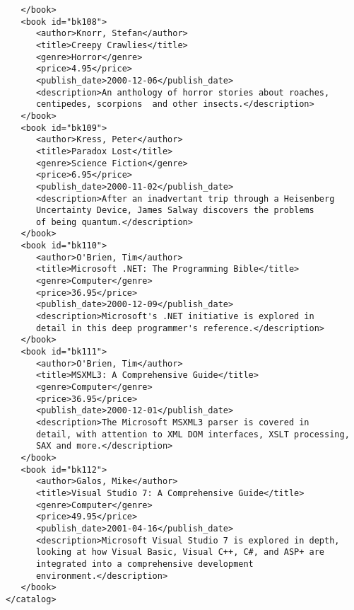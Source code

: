 \documentclass[11pt,english]{article}
\begin{document}
\begin{lstlisting}
   </book>
   <book id="bk108">
      <author>Knorr, Stefan</author>
      <title>Creepy Crawlies</title>
      <genre>Horror</genre>
      <price>4.95</price>
      <publish_date>2000-12-06</publish_date>
      <description>An anthology of horror stories about roaches,
      centipedes, scorpions  and other insects.</description>
   </book>
   <book id="bk109">
      <author>Kress, Peter</author>
      <title>Paradox Lost</title>
      <genre>Science Fiction</genre>
      <price>6.95</price>
      <publish_date>2000-11-02</publish_date>
      <description>After an inadvertant trip through a Heisenberg
      Uncertainty Device, James Salway discovers the problems 
      of being quantum.</description>
   </book>
   <book id="bk110">
      <author>O'Brien, Tim</author>
      <title>Microsoft .NET: The Programming Bible</title>
      <genre>Computer</genre>
      <price>36.95</price>
      <publish_date>2000-12-09</publish_date>
      <description>Microsoft's .NET initiative is explored in 
      detail in this deep programmer's reference.</description>
   </book>
   <book id="bk111">
      <author>O'Brien, Tim</author>
      <title>MSXML3: A Comprehensive Guide</title>
      <genre>Computer</genre>
      <price>36.95</price>
      <publish_date>2000-12-01</publish_date>
      <description>The Microsoft MSXML3 parser is covered in 
      detail, with attention to XML DOM interfaces, XSLT processing, 
      SAX and more.</description>
   </book>
   <book id="bk112">
      <author>Galos, Mike</author>
      <title>Visual Studio 7: A Comprehensive Guide</title>
      <genre>Computer</genre>
      <price>49.95</price>
      <publish_date>2001-04-16</publish_date>
      <description>Microsoft Visual Studio 7 is explored in depth,
      looking at how Visual Basic, Visual C++, C#, and ASP+ are 
      integrated into a comprehensive development 
      environment.</description>
   </book>
</catalog>

\end{lstlisting}
\newpage
\end{document}
